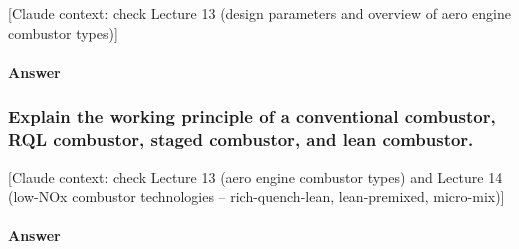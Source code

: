 {\color{gray}\footnotesize [Claude context: check Lecture 13 (design parameters and overview of aero engine combustor types)]}

\paragraph{Answer}




\subsubsection{Explain the working principle of a conventional combustor, RQL combustor, staged combustor, and lean combustor.}

{\color{gray}\footnotesize [Claude context: check Lecture 13 (aero engine combustor types) and Lecture 14 (low-NOx combustor technologies -- rich-quench-lean, lean-premixed, micro-mix)]}

\paragraph{Answer}



